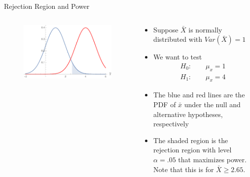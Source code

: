 \begin{frame}{Rejection Region and Power}
\begin{columns}
\begin{column}{0.5\textwidth}
\begin{figure}	
	\includegraphics[width=\textwidth]{hypothesis_test.pdf}	
\end{figure}
\end{column}
\begin{column}{0.5\textwidth}
\begin{itemize}
	\item Suppose $\bar{X}$ is normally distributed with $Var\left(\bar{X}\right)=1$ 

	\item We want to test \[
\begin{array}{c}
H_{0}:\qquad\mu_{x}=1\\
H_{1}:\qquad\mu_{x}= 4
\end{array}
\]
	\item The blue and red lines are the PDF of $\bar{x}$ under the null and alternative hypotheses, respectively 

	\item The shaded region is the rejection region with level $\alpha = .05$ that maximizes power. 
	Note that this is for $\bar{X}\ge 2.65$.
	
\end{itemize}

\end{column}

\end{columns}
\end{frame}



